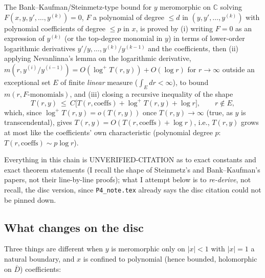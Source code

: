 \documentclass[11pt]{article}
\theoremstyle{remark}
\newcommand{\C}{\mathbb C}
\begin{document}
The Bank--Kaufman/Steinmetz-type bound for $y$ meromorphic on $\C$ solving
$F(x,y,y',\ldots,y^{(k)})=0$, $F$ a polynomial of degree $\le d$ in $(y,y',\ldots,y^{(k)})$ with
polynomial coefficients of degree $\le p$ in $x$, is proved by (i) writing
$F=0$ as an expression of $y^{(k)}$ (or the top-degree monomial in $y$) in terms of
lower-order logarithmic derivatives $y'/y,\ldots,y^{(k)}/y^{(k-1)}$ and the coefficients, then
(ii) applying Nevanlinna's lemma on the logarithmic derivative,
$m(r,y^{(i)}/y^{(i-1)})=O(\log^+T(r,y))+O(\log r)$ for $r\to\infty$ outside an exceptional set $E$
of finite \emph{linear} measure ($\int_E dr<\infty$), to bound $m(r,F\text{-monomials})$, and (iii)
closing a recursive inequality of the shape
\[
T(r,y)\ \le\ C\big[T(r,\text{coeffs})+\log^+T(r,y)+\log r\big],\qquad r\notin E,
\]
which, since $\log^+T(r,y)=o(T(r,y))$ once $T(r,y)\to\infty$ (true, as $y$ is transcendental), gives
$T(r,y)=O(T(r,\text{coeffs})+\log r)$, i.e., $T(r,y)$ grows at most like the coefficients' own
characteristic (polynomial degree $p$: $T(r,\text{coeffs})\sim p\log r$).

Everything in this chain is UNVERIFIED-CITATION as to exact constants and exact theorem
statements (I recall the shape of Steinmetz's and Bank--Kaufman's papers, not their line-by-line
proofs); what I attempt below is to \emph{re-derive}, not recall, the disc version, since
\texttt{P4\_note.tex} already says the disc citation could not be pinned down.

\subsection{What changes on the disc}

Three things are different when $y$ is meromorphic only on $|x|<1$ with $|x|=1$ a natural
boundary, and $x$ is confined to polynomial (hence bounded, holomorphic on $\overline D$)
coefficients:
\end{document}

